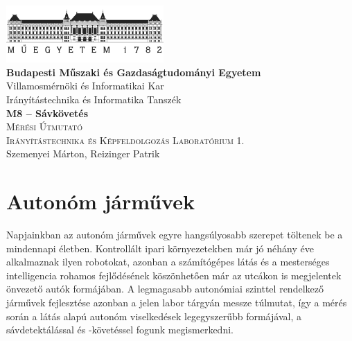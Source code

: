 \documentclass[12pt,a4paper,oneside]{report}             %
\author{\vikauthor}
\title{\viktitle}
\newcommand{\vikauthor}{Szemenyei Márton, Reizinger Patrik}
\newcommand{\viktitle}{M8 – Sávkövetés}
\newcommand{\vikdept}{Irányítástechnika és Informatika Tanszék}
\newcommand{\vikdoktipus}{Irányítástechnika és Képfeldolgozás Laboratórium 1.}
\newcommand{\viksubtitle}{Mérési Útmutató}
\newcommand{\hsp}{\hspace{20pt}}
\begin{document}
\onehalfspacing

\begin{titlepage}
\begin{center}
\includegraphics[width=60mm,keepaspectratio]{images/logo.png}\\
\vspace{0.3cm}
\textbf{Budapesti Műszaki és Gazdaságtudományi Egyetem}\\
\textmd{Villamosmérnöki és Informatikai Kar}\\
\textmd{\vikdept}\\[5cm]

\vspace{0.4cm}
{\huge \bfseries \viktitle}\\[2cm]
\textsc{\Large \viksubtitle}\\[1cm]
\textsc{\Large \vikdoktipus}\\[6cm]

\vfill
{\large \vikauthor}
\end{center}
\end{titlepage}


\singlespacing
\tableofcontents\thispagestyle{fancy}
\titleformat{\chapter}[hang]{\Huge\bfseries}{\thechapter\hsp}{0pt}{\Huge\bfseries}
\onehalfspacing

\chapter{Autonóm járművek}

Napjainkban az autonóm járművek egyre hangsúlyosabb szerepet töltenek be a mindennapi életben. Kontrollált ipari környezetekben már jó néhány éve alkalmaznak ilyen robotokat, azonban a számítógépes látás és a mesterséges intelligencia rohamos fejlődésének köszönhetően már az utcákon is megjelentek önvezető autók formájában. A legmagasabb autonómiai szinttel rendelkező járművek fejlesztése azonban a jelen labor tárgyán messze túlmutat, így a mérés során a látás alapú autonóm viselkedések legegyszerűbb formájával, a sávdetektálással és -követéssel fogunk megismerkedni.
\end{document}
